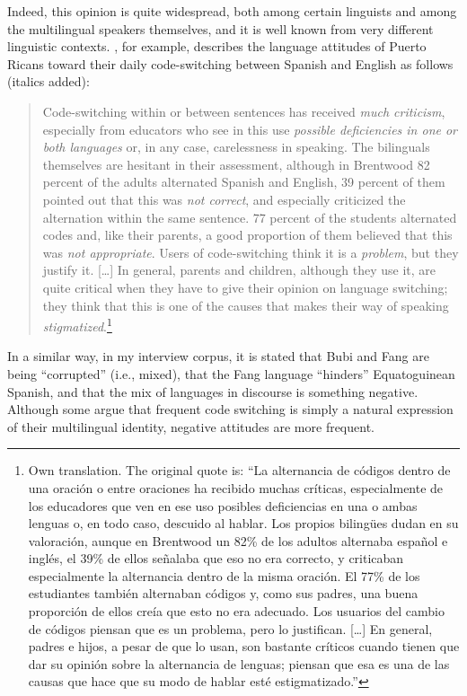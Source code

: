 \documentclass[output=paper]{langscibook}
\begin{document}
Indeed, this opinion is quite widespread, both among certain linguists and among the multilingual speakers themselves, and it is well known from very different linguistic contexts. \citet[307–308]{morales_de_walter_puertorriquenos_2008}, for example, describes the language attitudes of Puerto Ricans toward their daily code-switching between Spanish and English as follows (italics added):

\begin{quote}
Code-switching within or between sentences has received \textit{much criticism}, especially from educators who see in this use \textit{possible deficiencies in one or both languages} or, in any case, carelessness in speaking. The bilinguals themselves are hesitant in their assessment, although in Brentwood 82 percent of the adults alternated Spanish and English, 39 percent of them pointed out that this was \textit{not correct}, and especially criticized the alternation within the same sentence. 77 percent of the students alternated codes and, like their parents, a good proportion of them believed that this was \textit{not appropriate}. Users of code-switching think it is a \textit{problem}, but they justify it. […] In general, parents and children, although they use it, are quite critical when they have to give their opinion on language switching; they think that this is one of the causes that makes their way of speaking \textit{stigmatized}.\footnote{Own translation. The original quote is: “La alternancia de códigos dentro de una oración o entre oraciones ha recibido muchas críticas, especialmente de los educadores que ven en ese uso posibles deficiencias en una o ambas lenguas o, en todo caso, descuido al hablar. Los propios bilingües dudan en su valoración, aunque en Brentwood un 82\% de los adultos alternaba español e inglés, el 39\% de ellos señalaba que eso no era correcto, y criticaban especialmente la alternancia dentro de la misma oración. El 77\% de los estudiantes también alternaban códigos y, como sus padres, una buena proporción de ellos creía que esto no era adecuado. Los usuarios del cambio de códigos piensan que es un problema, pero lo justifican. […] En general, padres e hijos, a pesar de que lo usan, son bastante críticos cuando tienen que dar su opinión sobre la alternancia de lenguas; piensan que esa es una de las causas que hace que su modo de hablar esté estigmatizado.”}
\end{quote}

In a similar way, in my interview corpus, it is stated that Bubi and Fang are being “corrupted” (i.e., mixed), that the Fang language “hinders” Equatoguinean Spanish, and that the mix of languages in discourse is something negative. Although some argue that frequent code switching is simply a natural expression of their multilingual identity, negative attitudes are more frequent.
\end{document}
